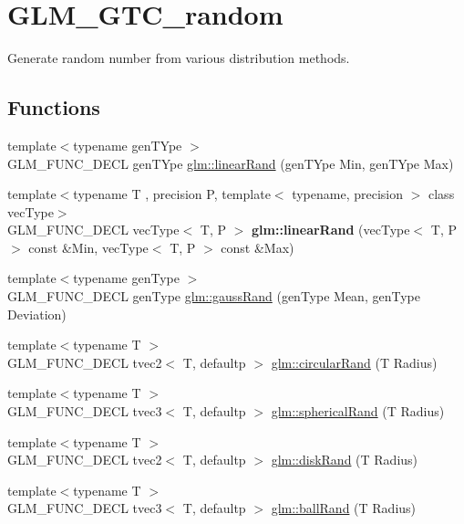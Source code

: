 \hypertarget{group__gtc__random}{\section{G\-L\-M\-\_\-\-G\-T\-C\-\_\-random}
\label{group__gtc__random}
}


Generate random number from various distribution methods.  


\subsection*{Functions}
\begin{DoxyCompactItemize}
\item 
{\footnotesize template$<$typename gen\-T\-Ype $>$ }\\G\-L\-M\-\_\-\-F\-U\-N\-C\-\_\-\-D\-E\-C\-L gen\-T\-Ype \hyperlink{group__gtc__random_ga12aebc19b85a8c736f5801c2f7b9b716}{glm\-::linear\-Rand} (gen\-T\-Ype Min, gen\-T\-Ype Max)
\item 
\hypertarget{group__gtc__random_gaba9cec867916d894d794a32897b7fdfd}{{\footnotesize template$<$typename T , precision P, template$<$ typename, precision $>$ class vec\-Type$>$ }\\G\-L\-M\-\_\-\-F\-U\-N\-C\-\_\-\-D\-E\-C\-L vec\-Type$<$ T, P $>$ {\bfseries glm\-::linear\-Rand} (vec\-Type$<$ T, P $>$ const \&Min, vec\-Type$<$ T, P $>$ const \&Max)}\label{group__gtc__random_gaba9cec867916d894d794a32897b7fdfd}

\item 
{\footnotesize template$<$typename gen\-Type $>$ }\\G\-L\-M\-\_\-\-F\-U\-N\-C\-\_\-\-D\-E\-C\-L gen\-Type \hyperlink{group__gtc__random_ga5193a83e49e4fdc5652c084711083574}{glm\-::gauss\-Rand} (gen\-Type Mean, gen\-Type Deviation)
\item 
{\footnotesize template$<$typename T $>$ }\\G\-L\-M\-\_\-\-F\-U\-N\-C\-\_\-\-D\-E\-C\-L tvec2$<$ T, defaultp $>$ \hyperlink{group__gtc__random_gae989c26a2899b2fb7444abe7c275c29c}{glm\-::circular\-Rand} (T Radius)
\item 
{\footnotesize template$<$typename T $>$ }\\G\-L\-M\-\_\-\-F\-U\-N\-C\-\_\-\-D\-E\-C\-L tvec3$<$ T, defaultp $>$ \hyperlink{group__gtc__random_gaa9a6fc2d7a295b3857f7db23b1053d9d}{glm\-::spherical\-Rand} (T Radius)
\item 
{\footnotesize template$<$typename T $>$ }\\G\-L\-M\-\_\-\-F\-U\-N\-C\-\_\-\-D\-E\-C\-L tvec2$<$ T, defaultp $>$ \hyperlink{group__gtc__random_gad3a3ee7d26502a31ba552cb627a68606}{glm\-::disk\-Rand} (T Radius)
\item 
{\footnotesize template$<$typename T $>$ }\\G\-L\-M\-\_\-\-F\-U\-N\-C\-\_\-\-D\-E\-C\-L tvec3$<$ T, defaultp $>$ \hyperlink{group__gtc__random_ga5506dee301160e3a06aef9b9bc7a0a83}{glm\-::ball\-Rand} (T Radius)
\end{DoxyCompactItemize}


